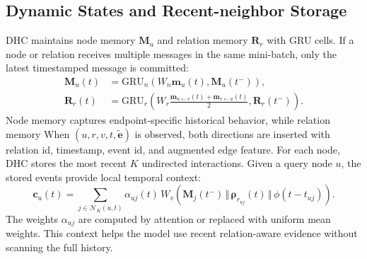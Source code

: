 \subsection{Dynamic States and Recent-neighbor Storage}
DHC maintains node memory $\mathbf{M}_u$ and relation memory $\mathbf{R}_r$ with GRU cells. 
If a node or relation receives multiple messages in the same mini-batch, only the latest timestamped message is committed:
\begin{align}
\mathbf{M}_u(t) &= \mathrm{GRU}_n\left(W_n\mathbf{m}_{u}(t),\mathbf{M}_u(t^-)\right),\\
\mathbf{R}_r(t) &= \mathrm{GRU}_r\left(W_r\frac{\mathbf{m}_{u\leftarrow v}(t)+\mathbf{m}_{v\leftarrow u}(t)}{2},\mathbf{R}_r(t^-)\right).
\end{align}
Node memory captures endpoint-specific historical behavior, while relation memory
When $(u,r,v,t,\tilde{\mathbf{e}})$ is observed, both directions are inserted with relation id, timestamp, event id, and augmented edge feature.  
For each node, DHC stores the most recent $K$ undirected interactions. Given a query node $u$, the stored events provide local temporal context:
\begin{equation}
\mathbf{c}_u(t)=\sum_{j\in\mathcal{N}_K(u,t)}\alpha_{uj}(t)\,W_v\left(\mathbf{M}_j(t^-)\,\Vert\,\boldsymbol{\rho}_{r_{uj}}(t)\,\Vert\,\phi(t-t_{uj})\right).
\end{equation}
The weights $\alpha_{uj}$ are computed by attention or replaced with uniform mean weights. This context helps the model use recent relation-aware evidence without scanning the full history.

